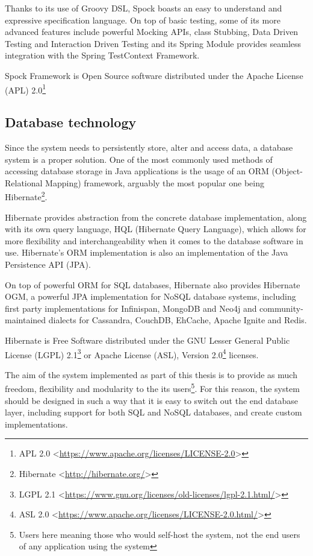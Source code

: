 Thanks to its use of Groovy DSL, Spock boasts an easy to understand and expressive specification language. On top of basic testing, some of its more advanced features include powerful Mocking APIs, class Stubbing, Data Driven Testing and Interaction Driven Testing and its Spring Module provides seamless integration with the Spring TestContext Framework\cite{spock}.

Spock Framework is Open Source software distributed under the Apache License (APL) 2.0\footnote{APL 2.0 <\url{https://www.apache.org/licenses/LICENSE-2.0}>}

\subsection{Database technology}
Since the system needs to persistently store, alter and access data, a database system is a proper solution. One of the most commonly used methods of accessing database storage in Java applications is the usage of an ORM (Object-Relational Mapping) framework, arguably the most popular one being Hibernate\footnote{Hibernate <\url{http://hibernate.org/}>}.

Hibernate provides abstraction from the concrete database implementation, along with its own query language, HQL (Hibernate Query Language), which allows for more flexibility and interchangeability when it comes to the database software in use. Hibernate's ORM implementation is also an implementation of the Java Persistence API (JPA)\cite{hibernate-orm}.

On top of powerful ORM for SQL databases, Hibernate also provides Hibernate OGM, a powerful JPA implementation for NoSQL database systems, including first party implementations for Infinispan, MongoDB and Neo4j and community-maintained dialects for Cassandra, CouchDB, EhCache, Apache Ignite and Redis\cite{hibernate-ogm}.

Hibernate is Free Software distributed under the GNU Lesser General Public License (LGPL) 2.1\footnote{LGPL 2.1 <\url{https://www.gnu.org/licenses/old-licenses/lgpl-2.1.html/}>} or Apache License (ASL), Version 2.0\footnote{ASL 2.0 <\url{https://www.apache.org/licenses/LICENSE-2.0.html/}>} licenses.

The aim of the system implemented as part of this thesis is to provide as much freedom, flexibility and modularity to the its users\footnote{Users here meaning those who would self-host the system, not the end users of any application using the system}. For this reason, the system should be designed in such a way that it is easy to switch out the end database layer, including support for both SQL and NoSQL databases, and create custom implementations.

